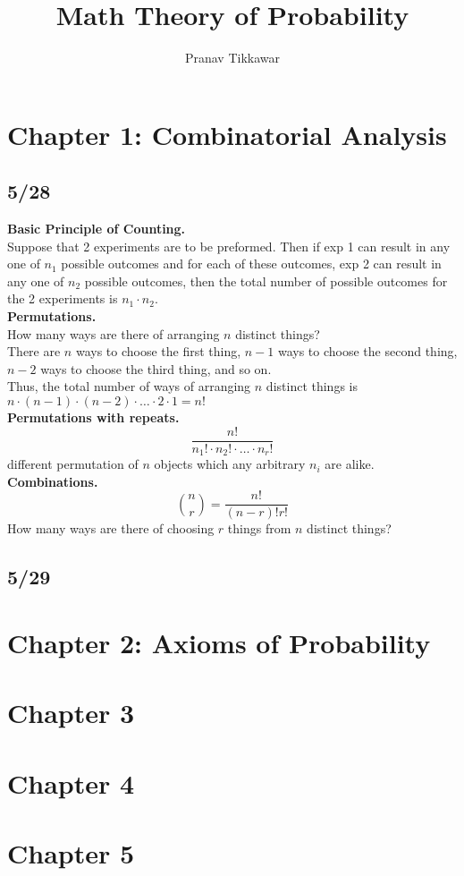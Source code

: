\documentclass{article}
\author{Pranav Tikkawar}
\title{Math Theory of Probability}
\begin{document}
\maketitle
\tableofcontents
\section{Chapter 1: Combinatorial Analysis}
\subsection*{5/28}
\textbf{Basic Principle of Counting.}\\
Suppose that 2 experiments are to be preformed. Then if exp 1 can result in any one of $n_1$ possible outcomes and for each of these outcomes, exp 2 can result in any one of $n_2$ possible outcomes, then the total number of possible outcomes for the 2 experiments is $n_1 \cdot n_2$.\\

\textbf{Permutations.}\\
How many ways are there of arranging $n$ distinct things?\\
There are $n$ ways to choose the first thing, $n-1$ ways to choose the second thing, $n-2$ ways to choose the third thing, and so on.\\
Thus, the total number of ways of arranging $n$ distinct things is $n \cdot (n-1) \cdot (n-2) \cdot \ldots \cdot 2 \cdot 1 = n!$\\

\textbf{Permutations with repeats.}\\
$$\frac{n!}{n_1! \cdot n_2! \cdot \ldots \cdot n_r!} $$
different permutation of $n$ objects which any arbitrary $n_i$ are alike.\\

\textbf{Combinations.}\\
$$ \binom{n}{r} = \frac{n!}{(n-r)!r!}$$
How many ways are there of choosing $r$ things from $n$ distinct things?
\subsection*{5/29}


\section{Chapter 2: Axioms of Probability}

\section{Chapter 3}

\section{Chapter 4}

\section{Chapter 5}
\end{document}
